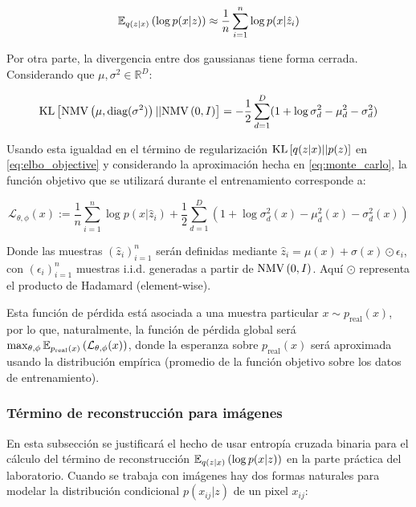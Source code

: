 \documentclass{article}
\begin{document}
\begin{equation}
	\mathbb{E}_{q(z|x)}\left(\log p(x|z)\right) \approx \frac{1}{n} \sum_{i=1}^n \log p(x|\hat{z}_i) \label{eq:monte_carlo}
\end{equation}

Por otra parte, la divergencia entre dos gaussianas tiene forma cerrada. Considerando que $\mu,\sigma^2\in\mathbb{R}^D$:

\begin{equation}
	\text{KL}\left[\text{NMV}\left(\mu,\text{diag}(\sigma^2)\right)||\text{NMV}\left(0,I\right)\right] = -\frac{1}{2} \sum_{d=1}^D (1+\log\sigma^2_d - \mu^2_d - \sigma^2_d)
\end{equation}

Usando esta igualdad en el término de regularización $\text{KL}\left[q(z|x)||p(z)\right]$ en \eqref{eq:elbo_objective} y considerando la aproximación hecha en \eqref{eq:monte_carlo}, la función objetivo que se utilizará durante el entrenamiento corresponde a:

\begin{equation}
	\mathcal{L}_{\theta,\phi}(x):= \frac{1}{n} \sum_{i=1}^n \log p(x|\hat{z}_i) + \frac{1}{2} \sum_{d=1}^D (1+\log\sigma^2_d(x) - \mu^2_d(x) - \sigma^2_d(x))
\end{equation}

Donde las muestras $(\hat{z}_i)_{i=1}^n$ serán definidas mediante $\hat{z}_i = \mu(x) + \sigma(x)\odot\epsilon_i$, con $(\epsilon_i)_{i=1}^n$ muestras i.i.d. generadas a partir de $\text{NMV}\left(0,I\right)$. Aquí $\odot$ representa el producto de Hadamard (element-wise).

Esta función de pérdida está asociada a una muestra particular $x\sim p_{\text{real}}(x)$, por lo que, naturalmente, la función de pérdida global será $\max_{\theta,\phi} \mathbb{E}_{p_\text{real}(x)}\left(\mathcal{L}_{\theta,\phi}(x)\right)$, donde la esperanza sobre $p_\text{real}(x)$ será aproximada usando la distribución empírica (promedio de la función objetivo sobre los datos de entrenamiento).

\subsubsection{Término de reconstrucción para imágenes}

En esta subsección se justificará el hecho de usar entropía cruzada binaria para el cálculo del término de reconstrucción $\mathbb{E}_{q(z|x)}\left(\log p(x|z)\right)$ en la parte práctica del laboratorio. Cuando se trabaja con imágenes hay dos formas naturales para modelar la distribución condicional $p(x_{ij}|z)$ de un pixel $x_{ij}$:
\end{document}
